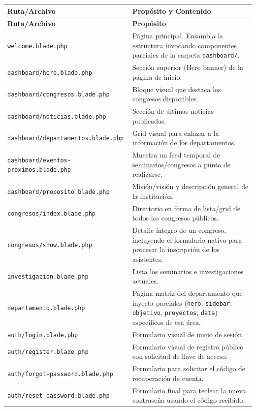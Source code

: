 \documentclass{article}
\begin{document}
\begin{longtable}{>{\raggedright\arraybackslash}p{5cm} >{\raggedright\arraybackslash}p{10cm}}
\toprule
\textbf{Ruta/Archivo} & \textbf{Propósito y Contenido} \\
\midrule
\endfirsthead
\toprule
\textbf{Ruta/Archivo} & \textbf{Propósito} \\
\midrule
\endhead
\bottomrule
\endfoot
\bottomrule
\endlastfoot
\texttt{welcome.blade.php} & Página principal. Ensambla la estructura invocando componentes parciales de la carpeta \texttt{dashboard/}. \\
\texttt{dashboard/hero.blade.php} & Sección superior (Hero banner) de la página de inicio. \\
\texttt{dashboard/congresos.blade.php} & Bloque visual que destaca los congresos disponibles. \\
\texttt{dashboard/noticias.blade.php} & Sección de últimas noticias publicadas. \\
\texttt{dashboard/departamentos.blade.php} & Grid visual para enlazar a la información de los departamentos. \\
\texttt{dashboard/eventos-proximos.blade.php} & Muestra un feed temporal de seminarios/congresos a punto de realizarse. \\
\texttt{dashboard/proposito.blade.php} & Misión/visión y descripción general de la institución. \\
\texttt{congresos/index.blade.php} & Directorio en forma de lista/grid de todos los congresos públicos. \\
\texttt{congresos/show.blade.php} & Detalle íntegro de un congreso, incluyendo el formulario nativo para procesar la inscripción de los asistentes. \\
\texttt{investigacion.blade.php} & Lista los seminarios e investigaciones actuales. \\
\texttt{departamento.blade.php} & Página matriz del departamento que inyecta parciales (\texttt{hero}, \texttt{sidebar}, \texttt{objetivo}, \texttt{proyectos}, \texttt{data}) específicos de esa área. \\
\texttt{auth/login.blade.php} & Formulario visual de inicio de sesión. \\
\texttt{auth/register.blade.php} & Formulario visual de registro público con solicitud de llave de acceso. \\
\texttt{auth/forgot-password.blade.php} & Formulario para solicitar el código de recuperación de cuenta. \\
\texttt{auth/reset-password.blade.php} & Formulario final para teclear la nueva contraseña usando el código recibido. \\
\end{longtable}
\end{document}
